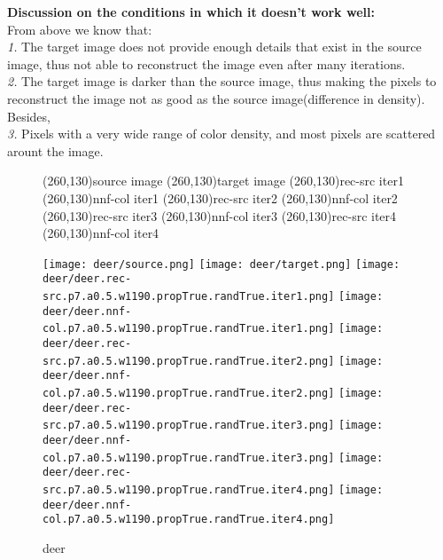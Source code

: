 \documentclass{article}
\begin{document}
\noindent
\textbf{Discussion on the conditions in which it doesn't work well:}\\[8pt]
From above we know that:\\[5pt]
\textit{1.} The target image does not provide enough details that exist in the source image, thus not able to reconstruct the image even after many iterations.\\[3pt]
\textit{2.} The target image is darker than the source image, thus making the pixels to reconstruct the image not as good as the source image(difference in density).\\[3pt]
Besides,\\[5pt]
\textit{3.} Pixels with a very wide range of color density, and most pixels are scattered arount the image.

\begin{center}
\textbf{\large{}}
\end{center}

\begin{figure}[H]
\centering
\framebox(260,130){source image}\enskip
\framebox(260,130){target image}
\framebox(260,130){rec-src iter1}\enskip
\framebox(260,130){nnf-col iter1}
\framebox(260,130){rec-src iter2}\enskip
\framebox(260,130){nnf-col iter2}
\framebox(260,130){rec-src iter3}\enskip
\framebox(260,130){nnf-col iter3}
\framebox(260,130){rec-src iter4}\enskip
\framebox(260,130){nnf-col iter4}
\end{figure}

\begin{figure}[H]
\centering
\texttt{[image: deer/source.png]}\enskip
\texttt{[image: deer/target.png]}
\texttt{[image: deer/deer.rec-src.p7.a0.5.w1190.propTrue.randTrue.iter1.png]}\enskip
\texttt{[image: deer/deer.nnf-col.p7.a0.5.w1190.propTrue.randTrue.iter1.png]}
\texttt{[image: deer/deer.rec-src.p7.a0.5.w1190.propTrue.randTrue.iter2.png]}\enskip
\texttt{[image: deer/deer.nnf-col.p7.a0.5.w1190.propTrue.randTrue.iter2.png]}
\texttt{[image: deer/deer.rec-src.p7.a0.5.w1190.propTrue.randTrue.iter3.png]}\enskip
\texttt{[image: deer/deer.nnf-col.p7.a0.5.w1190.propTrue.randTrue.iter3.png]}
\texttt{[image: deer/deer.rec-src.p7.a0.5.w1190.propTrue.randTrue.iter4.png]}\enskip
\texttt{[image: deer/deer.nnf-col.p7.a0.5.w1190.propTrue.randTrue.iter4.png]}
\caption{deer}
\end{figure}
\end{document}
